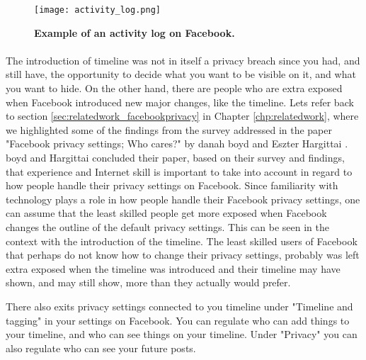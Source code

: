 \begin{figure}[t]
\centering
\texttt{[image: activity\_log.png]}
\caption [Example of an activity log on Facebook.]{\textbf{Example of an activity log on Facebook.}} 
\label{fig:activitylog}
\end{figure}

\paragraph{}
The introduction of timeline was not in itself a privacy breach since you had, and still have, the opportunity to decide what you want to be visible on it, and what you want to hide. On the other hand, there are people who are extra exposed when Facebook introduced new major changes, like the timeline. Lets refer back to section \ref{sec:relatedwork_facebookprivacy} in Chapter \ref{chp:relatedwork}, where we highlighted some of the findings from the survey addressed in the paper "Facebook privacy settings; Who cares?" by danah boyd and Eszter Hargittai \cite{whocares}. boyd and Hargittai concluded their paper, based on their survey and findings, that experience and Internet skill is important to take into account in regard to how people handle their privacy settings on Facebook. Since familiarity with technology plays a role in how people handle their Facebook privacy settings, one can assume that the least skilled people get more exposed when Facebook changes the outline of the default privacy settings. 
This can be seen in the context with the introduction of the timeline. The least skilled users of Facebook that perhaps do not know how to change their privacy settings, probably was left extra exposed when the timeline was introduced and their timeline may have shown, and may still show, more than they actually would prefer. 

There also exits privacy settings connected to you timeline under "Timeline and tagging" in your settings on Facebook. You can regulate who can add things to your timeline, and who can see things on your timeline. Under "Privacy" you can also regulate who can see your future posts. 

